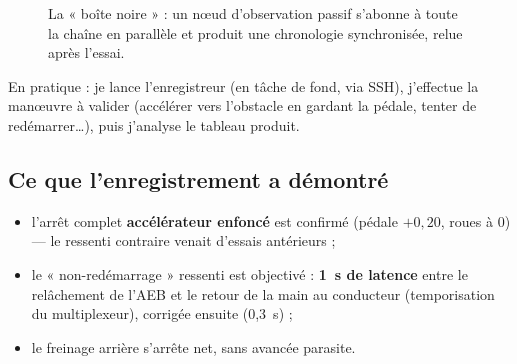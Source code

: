 \documentclass[11pt,a4paper]{article}
\begin{document}
\begin{figure}[h]
\centering
{}
\caption{La « boîte noire » : un nœud d'observation passif s'abonne à toute la chaîne
en parallèle et produit une chronologie synchronisée, relue après l'essai.}
\end{figure}

En pratique : je lance l'enregistreur (en tâche de fond, via SSH), j'effectue la
manœuvre à valider (accélérer vers l'obstacle en gardant la pédale, tenter de
redémarrer\ldots), puis j'analyse le tableau produit.

\subsection{Ce que l'enregistrement a démontré}
\begin{center}
\end{center}
\vspace{2pt}

\begin{itemize}[leftmargin=1.4em,itemsep=1pt]
  \item l'arrêt complet \textbf{accélérateur enfoncé} est confirmé (pédale $+0{,}20$,
        roues à 0) — le ressenti contraire venait d'essais antérieurs ;
  \item le « non-redémarrage » ressenti est objectivé : \textbf{1~s de latence}
        entre le relâchement de l'AEB et le retour de la main au conducteur
        (temporisation du multiplexeur), corrigée ensuite (0,3~s) ;
  \item le freinage arrière s'arrête net, sans avancée parasite.
\end{itemize}
\end{document}
